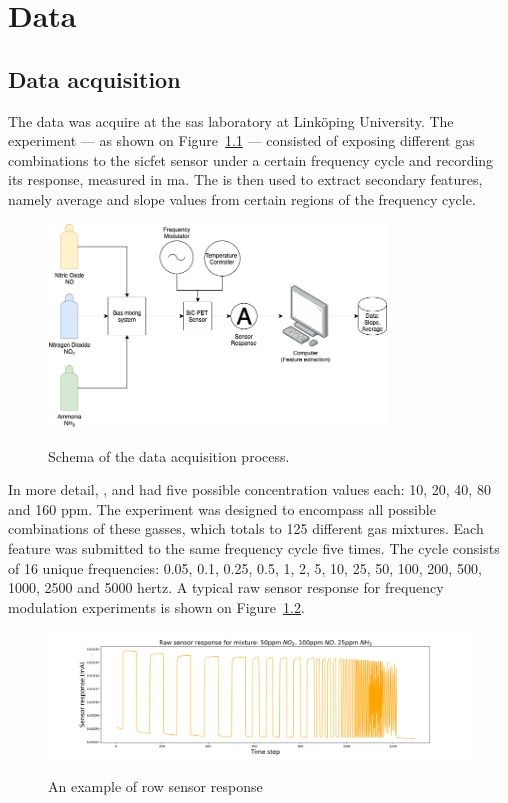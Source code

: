\chapter{Data}
\label{cha:data}

\section{Data acquisition}
\label{sec:data-acquisition}

The data was acquire at the \acrfull{sas} laboratory at Linköping University. The experiment --- as shown on Figure~\ref{fig:experimental-setup} --- consisted of exposing different gas combinations to the \acrshort{sicfet} sensor under a certain frequency cycle and recording its response, measured in \acrfull{ma}. The is then used to extract secondary features, namely average and slope values from certain regions of the frequency cycle.

\begin{figure}[!htb]
	\centering
	\includegraphics[width=0.8\textwidth]{../figures/experimental-setup.png}
	\label{fig:experimental-setup}
	\caption{Schema of the data acquisition process.}
\end{figure}

In more detail, ,  and  had five possible concentration values each: 10, 20, 40, 80 and 160 \acrfull{ppm}. The experiment was designed to encompass all possible combinations of these gasses, which totals to 125 different gas mixtures. Each feature was submitted to the same frequency cycle five times. The cycle consists of 16 unique frequencies: 0.05, 0.1, 0.25, 0.5, 1, 2, 5, 10, 25, 50, 100, 200, 500, 1000, 2500 and 5000 \acrfull{hertz}. A typical raw sensor response for frequency modulation experiments is shown on Figure~\ref{fig:raw}.

\begin{figure}[!htb]
	\centering
	\includegraphics[width=1.2\textwidth]{../figures/raw-response.png}
	\label{fig:raw}
	\caption{An example of row sensor response}
\end{figure}

